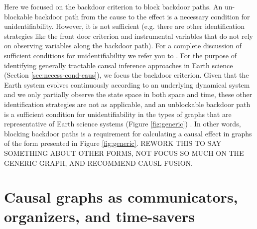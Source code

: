 \documentclass[12pt]{article}
\begin{document}
Here we focused on the backdoor criterion to block backdoor paths. An
un-blockable backdoor path from the cause to the effect is a necessary
condition for unidentifiability. However, it is not sufficient
(e.g. there are other identification strategies like the front door
criterion and instrumental variables that do not rely on observing
variables along the backdoor path). For a complete discussion of
sufficient conditions for unidentifiability we refer you to
\citet{shpitser2006}. For the purpose of identifying generally
tractable causal inference approaches in Earth science (Section
\ref{sec:necess-cond-caus}), we focus the backdoor criterion. Given
that the Earth system evolves continuously according to an underlying
dynamical system and we only partially observe the state space in both
space and time, these other identification strategies are not as
applicable, and an unblockable backdoor path is a sufficient condition
for unidentifiability in the types of graphs that are representative
of Earth science systems (Figure \ref{fig:generic})
\citep{tian2002general}. In other words, blocking backdoor paths is a
requirement for calculating a causal effect in graphs of the form
presented in Figure \ref{fig:generic}. REWORK THIS TO SAY SOMETHING
ABOUT OTHER FORMS, NOT FOCUS SO MUCH ON THE GENERIC GRAPH, AND
RECOMMEND CAUSL FUSION.

\section{Causal graphs as communicators, organizers, and time-savers}\label{sec:causal-graphs-as}
\end{document}
